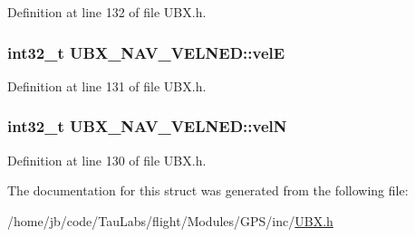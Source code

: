 \-Definition at line 132 of file \-U\-B\-X.\-h.

\hypertarget{struct_u_b_x___n_a_v___v_e_l_n_e_d_a6a8d3e61f2818644777283c0ea93dec8}{
\subsubsection[{vel\-E}]{\setlength{\rightskip}{0pt plus 5cm}int32\-\_\-t {\bf \-U\-B\-X\-\_\-\-N\-A\-V\-\_\-\-V\-E\-L\-N\-E\-D\-::vel\-E}}}\label{struct_u_b_x___n_a_v___v_e_l_n_e_d_a6a8d3e61f2818644777283c0ea93dec8}


\-Definition at line 131 of file \-U\-B\-X.\-h.

\hypertarget{struct_u_b_x___n_a_v___v_e_l_n_e_d_ab9c0e5be2137b6287caa0d98942c521d}{
\subsubsection[{vel\-N}]{\setlength{\rightskip}{0pt plus 5cm}int32\-\_\-t {\bf \-U\-B\-X\-\_\-\-N\-A\-V\-\_\-\-V\-E\-L\-N\-E\-D\-::vel\-N}}}\label{struct_u_b_x___n_a_v___v_e_l_n_e_d_ab9c0e5be2137b6287caa0d98942c521d}


\-Definition at line 130 of file \-U\-B\-X.\-h.



\-The documentation for this struct was generated from the following file\-:\begin{DoxyCompactItemize}
\item 
/home/jb/code/\-Tau\-Labs/flight/\-Modules/\-G\-P\-S/inc/\hyperlink{_u_b_x_8h}{\-U\-B\-X.\-h}\end{DoxyCompactItemize}
